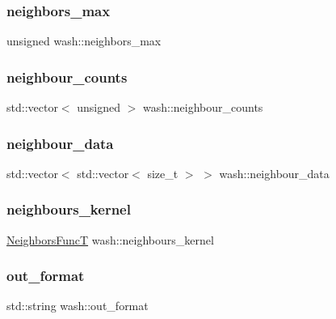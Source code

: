 \subsubsection{\texorpdfstring{neighbors\+\_\+max}{neighbors\_max}}
{\footnotesize\ttfamily unsigned wash\+::neighbors\+\_\+max}

\mbox{\label{namespacewash_a15b300d4e8a12c38c1e54650db4476f1}} 
\subsubsection{\texorpdfstring{neighbour\+\_\+counts}{neighbour\_counts}}
{\footnotesize\ttfamily std\+::vector$<$ unsigned $>$ wash\+::neighbour\+\_\+counts}

\mbox{\label{namespacewash_aa6580757775fdbcb82b9a6b6f75332a1}} 
\subsubsection{\texorpdfstring{neighbour\+\_\+data}{neighbour\_data}}
{\footnotesize\ttfamily std\+::vector$<$ std\+::vector$<$ size\+\_\+t $>$ $>$ wash\+::neighbour\+\_\+data}

\mbox{\label{namespacewash_a0d969973e893cc2316bad2597bf0ad17}} 
\subsubsection{\texorpdfstring{neighbours\+\_\+kernel}{neighbours\_kernel}}
{\footnotesize\ttfamily \mbox{\hyperlink{namespacewash_a8135d763bfc59fce07b49873d8af0ed6}{Neighbors\+FuncT}} wash\+::neighbours\+\_\+kernel}

\mbox{\label{namespacewash_a035f6f724e8c8720dfce129a9de67097}} 
\subsubsection{\texorpdfstring{out\+\_\+format}{out\_format}}
{\footnotesize\ttfamily std\+::string wash\+::out\+\_\+format}

